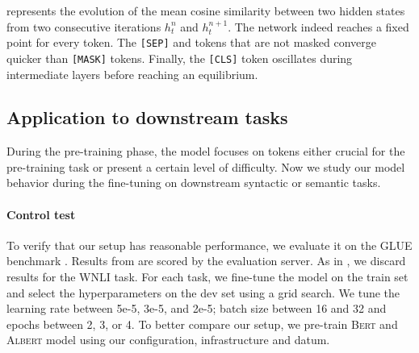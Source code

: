 


 represents the evolution of the mean cosine similarity between two hidden states from two consecutive iterations $h^n_t$ and $h^{n+1}_t$. The network indeed reaches a fixed point for every token. The \texttt{[SEP]} and tokens that are not masked converge quicker than \texttt{[MASK]} tokens. Finally, the \texttt{[CLS]} token oscillates during intermediate layers before reaching an equilibrium.

\subsection{Application to downstream tasks}

During the pre-training phase, the model focuses on tokens  either crucial for the pre-training task or  present a certain level of difficulty. Now we study our model behavior during the fine-tuning on downstream syntactic or semantic tasks.


\paragraph{Control test} To verify that our setup has reasonable performance, we evaluate it on the GLUE benchmark \parencite{wang_19}.
Results from  are scored by the evaluation server. As in \textcite{devlin_19}, we discard results for the WNLI task. For each task, we fine-tune the model on the train set and select the hyperparameters on the dev set using a grid search. We tune the learning rate between 5e-5, 3e-5, and 2e-5; batch size between 16 and 32 and epochs between 2, 3, or 4. To better compare our setup, we pre-train \textsc{Bert} and \textsc{Albert} model using our configuration, infrastructure and datum.

